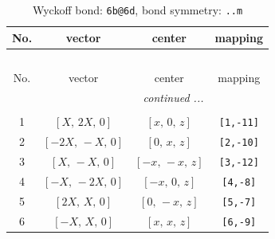 \documentclass[fleqn,8pt]{jsarticle}
\begin{document}
\begin{longtable}{cccc}
\caption{Wyckoff bond: {\tt 6b@6d}, bond symmetry: {\tt ..m}}
 \\
 \hline \hline
No. & vector & center & mapping \\ \hline \endfirsthead

\multicolumn{3}{l}{\tablename\ \thetable{}} \\
 \hline \hline
No. & vector & center & mapping \\ \hline \endhead

 \hline \hline
\multicolumn{3}{r}{\footnotesize\it continued ...} \\ \endfoot

 \hline \hline
\multicolumn{3}{r}{} \\ \endlastfoot

1 & $\left[ X,\, 2 X,\, 0 \right]$ & $\left[ x,\, 0,\, z \right]$ & {\tt [1,-11]} \\ \hline
2 & $\left[ - 2 X,\, - X,\, 0 \right]$ & $\left[ 0,\, x,\, z \right]$ & {\tt [2,-10]} \\ \hline
3 & $\left[ X,\, - X,\, 0 \right]$ & $\left[ - x,\, - x,\, z \right]$ & {\tt [3,-12]} \\ \hline
4 & $\left[ - X,\, - 2 X,\, 0 \right]$ & $\left[ - x,\, 0,\, z \right]$ & {\tt [4,-8]} \\ \hline
5 & $\left[ 2 X,\, X,\, 0 \right]$ & $\left[ 0,\, - x,\, z \right]$ & {\tt [5,-7]} \\ \hline
6 & $\left[ - X,\, X,\, 0 \right]$ & $\left[ x,\, x,\, z \right]$ & {\tt [6,-9]} \\
\end{longtable}
\renewcommand{\arraystretch}{1.2}
\end{document}
